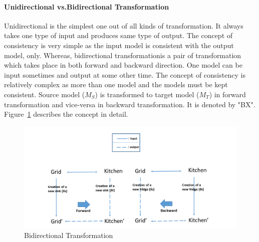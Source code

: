 \paragraph{Unidirectional vs.Bidirectional Transformation}  Unidirectional is the simplest one out of all kinds of transformation. It always takes one type of input and produces same type of output. The concept of consistency is very simple as the input model is consistent with the output model, only.
\newline Whereas, bidirectional transformationis a pair of transformation which takes place in both forward and backward direction. One model can be input sometimes and output at some other time. The concept of consistency is relatively complex as more than one model and the models must be kept consistent. Source model ($M_{S}$) is transformed to target model ($M_{T}$) in forward transformation and vice-versa in backward transformation. It is denoted by "BX". 
\newline Figure~\ref{fig:BX_Diagram} describes the concept in detail.
\begin{figure}
	\includegraphics[width=1\textwidth]{figures/BX}
	\caption{Bidirectional Transformation}
	\label{fig:BX_Diagram}
\end{figure}


